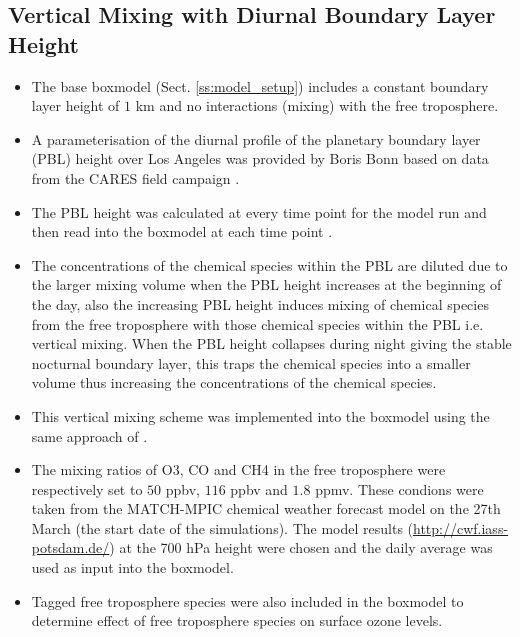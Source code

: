 {%
    \begin{landscape}%
        \centering%
        
        \vspace{-2mm}%
        \label{t:Belgium_MCM_emissions}%
    \end{landscape}%
}

\subsection{Vertical Mixing with Diurnal Boundary Layer Height} \label{ss:vertical_mixing}
\begin{itemize}
    \item The base boxmodel (Sect. \ref{ss:model_setup}) includes a constant boundary layer height of $1$ km and no interactions (mixing) with the free troposphere.
    \item A parameterisation of the diurnal profile of the planetary boundary layer (PBL) height over Los Angeles was provided by Boris Bonn based on data from the CARES field campaign \citep{CARES:2008} .
    \item The PBL height was calculated at every time point for the model run and then read into the boxmodel at each time point .
    \item The concentrations of the chemical species within the PBL are diluted due to the larger mixing volume when the PBL height increases at the beginning of the day, also the increasing PBL height induces mixing of chemical species from the free troposphere with those chemical species within the PBL i.e. vertical mixing. When the PBL height collapses during night giving the stable nocturnal boundary layer, this traps the chemical species into a smaller volume thus increasing the concentrations of the chemical species.
    \item This vertical mixing scheme was implemented into the boxmodel using the same approach of \citet{Lourens:2012}.
    \item The mixing ratios of O3, CO and CH4 in the free troposphere were respectively set to $50$ ppbv, $116$ ppbv and $1.8$ ppmv. These condions were taken from the MATCH-MPIC chemical weather forecast model on the 27th March (the start date of the simulations). The model results (\url{http://cwf.iass-potsdam.de/}) at the 700 hPa height were chosen and the daily average was used as input into the boxmodel. 
    \item Tagged free troposphere species were also included in the boxmodel to determine effect of free troposphere species on surface ozone levels.
\end{itemize}
